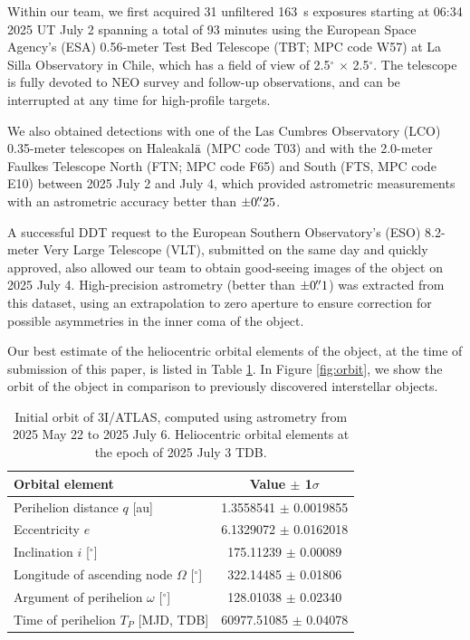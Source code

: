 \documentclass[linenumbers,twocolumn,longbib]{aastex7}
\begin{document}
Within our team, we first acquired 31 unfiltered 163~s exposures starting at 06:34 2025 UT July 2 spanning a total of 93 minutes using the European Space Agency's (ESA) 0.56-meter Test Bed Telescope (TBT; MPC code W57) at La Silla Observatory in Chile, which has a field of view of 2.5$^{\circ}$ $\times$ 2.5$^{\circ}$. The telescope is fully devoted to NEO survey and follow-up observations, and can be interrupted at any time for high-profile targets.

We also obtained detections with one of the Las Cumbres Observatory (LCO) 0.35-meter telescopes on Haleakal${\rm\bar{a}}$ (MPC code T03) and with the 2.0-meter Faulkes Telescope North (FTN; MPC code F65) and South (FTS, MPC code E10) between 2025 July 2 and July 4, which provided astrometric measurements with an astrometric accuracy better than $\pm0\mbox{$.\!\!^{\prime\prime}$}25$.

A successful DDT request to the European Southern Observatory's (ESO) 8.2-meter Very Large Telescope (VLT), submitted on the same day and quickly approved, also allowed our team to obtain good-seeing images of the object on 2025 July 4. High-precision astrometry (better than $\pm0\mbox{$.\!\!^{\prime\prime}$}1$) was extracted from this dataset, using an extrapolation to zero aperture to ensure correction for possible asymmetries in the inner coma of the object.

Our best estimate of the heliocentric orbital elements of the object, at the time of submission of this paper, is listed in Table \ref{table:orbit}. In Figure \ref{fig:orbit}, we show the orbit of the object in comparison to previously discovered interstellar objects.

\begin{table}
\centering
\caption{Initial orbit of 3I/ATLAS, computed using astrometry from 2025 May 22 to 2025 July 6. Heliocentric orbital elements at the epoch of 2025 July 3 TDB.}
\begin{tabular}{lc}
\hline
Orbital element & Value $\pm$ 1$\sigma$ \\
\hline
Perihelion distance $q$ [au]                    &   1.3558541 $\pm$ 0.0019855 \\
Eccentricity $e$                                &   6.1329072 $\pm$ 0.0162018 \\
Inclination $i$ [$^\circ$]                      & 175.11239   $\pm$ 0.00089  \\
Longitude of ascending node $\Omega$ [$^\circ$] & 322.14485   $\pm$ 0.01806  \\
Argument of perihelion $\omega$ [$^\circ$]      & 128.01038   $\pm$ 0.02340  \\
Time of perihelion $T_P$ [MJD, TDB]             & 60977.51085 $\pm$ 0.04078  \\
\hline
\end{tabular}
\label{table:orbit}
\end{table}
\end{document}
